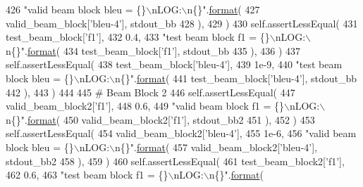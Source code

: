 \begin{DoxyCode}
426             \textcolor{stringliteral}{"valid beam block bleu = \{\}\(\backslash\)nLOG:\(\backslash\)n\{\}"}.\hyperlink{namespaceparlai_1_1chat__service_1_1services_1_1messenger_1_1shared__utils_a32e2e2022b824fbaf80c747160b52a76}{format}(
427                 valid\_beam\_block[\textcolor{stringliteral}{'bleu-4'}], stdout\_bb
428             ),
429         )
430         self.assertLessEqual(
431             test\_beam\_block[\textcolor{stringliteral}{'f1'}],
432             0.4,
433             \textcolor{stringliteral}{"test beam block f1 = \{\}\(\backslash\)nLOG:\(\backslash\)n\{\}"}.\hyperlink{namespaceparlai_1_1chat__service_1_1services_1_1messenger_1_1shared__utils_a32e2e2022b824fbaf80c747160b52a76}{format}(
434                 test\_beam\_block[\textcolor{stringliteral}{'f1'}], stdout\_bb
435             ),
436         )
437         self.assertLessEqual(
438             test\_beam\_block[\textcolor{stringliteral}{'bleu-4'}],
439             1e-9,
440             \textcolor{stringliteral}{"test beam block bleu = \{\}\(\backslash\)nLOG:\(\backslash\)n\{\}"}.\hyperlink{namespaceparlai_1_1chat__service_1_1services_1_1messenger_1_1shared__utils_a32e2e2022b824fbaf80c747160b52a76}{format}(
441                 test\_beam\_block[\textcolor{stringliteral}{'bleu-4'}], stdout\_bb
442             ),
443         )
444 
445         \textcolor{comment}{# Beam Block 2}
446         self.assertLessEqual(
447             valid\_beam\_block2[\textcolor{stringliteral}{'f1'}],
448             0.6,
449             \textcolor{stringliteral}{"valid beam block f1 = \{\}\(\backslash\)nLOG:\(\backslash\)n\{\}"}.\hyperlink{namespaceparlai_1_1chat__service_1_1services_1_1messenger_1_1shared__utils_a32e2e2022b824fbaf80c747160b52a76}{format}(
450                 valid\_beam\_block2[\textcolor{stringliteral}{'f1'}], stdout\_bb2
451             ),
452         )
453         self.assertLessEqual(
454             valid\_beam\_block2[\textcolor{stringliteral}{'bleu-4'}],
455             1e-6,
456             \textcolor{stringliteral}{"valid beam block bleu = \{\}\(\backslash\)nLOG:\(\backslash\)n\{\}"}.\hyperlink{namespaceparlai_1_1chat__service_1_1services_1_1messenger_1_1shared__utils_a32e2e2022b824fbaf80c747160b52a76}{format}(
457                 valid\_beam\_block2[\textcolor{stringliteral}{'bleu-4'}], stdout\_bb2
458             ),
459         )
460         self.assertLessEqual(
461             test\_beam\_block2[\textcolor{stringliteral}{'f1'}],
462             0.6,
463             \textcolor{stringliteral}{"test beam block f1 = \{\}\(\backslash\)nLOG:\(\backslash\)n\{\}"}.\hyperlink{namespaceparlai_1_1chat__service_1_1services_1_1messenger_1_1shared__utils_a32e2e2022b824fbaf80c747160b52a76}{format}(

\end{DoxyCode}
